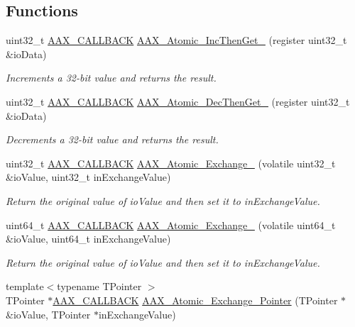 \subsection*{Functions}
\begin{DoxyCompactItemize}
\item 
uint32\+\_\+t \hyperlink{a00149_aaa22112139aa627574b1ef562f579d43}{A\+A\+X\+\_\+\+C\+A\+L\+L\+B\+A\+C\+K} \hyperlink{a00159_ad971a8dca9cea34ca7b3a0082c1c4795}{A\+A\+X\+\_\+\+Atomic\+\_\+\+Inc\+Then\+Get\+\_} (register uint32\+\_\+t \&io\+Data)
\begin{DoxyCompactList}\small\item\em Increments a 32-\/bit value and returns the result. \end{DoxyCompactList}\item 
uint32\+\_\+t \hyperlink{a00149_aaa22112139aa627574b1ef562f579d43}{A\+A\+X\+\_\+\+C\+A\+L\+L\+B\+A\+C\+K} \hyperlink{a00159_a1802487e752c85c59d097b0863bdf471}{A\+A\+X\+\_\+\+Atomic\+\_\+\+Dec\+Then\+Get\+\_} (register uint32\+\_\+t \&io\+Data)
\begin{DoxyCompactList}\small\item\em Decrements a 32-\/bit value and returns the result. \end{DoxyCompactList}\item 
uint32\+\_\+t \hyperlink{a00149_aaa22112139aa627574b1ef562f579d43}{A\+A\+X\+\_\+\+C\+A\+L\+L\+B\+A\+C\+K} \hyperlink{a00159_a44eb82707be40dd559db9051317c10d0}{A\+A\+X\+\_\+\+Atomic\+\_\+\+Exchange\+\_} (volatile uint32\+\_\+t \&io\+Value, uint32\+\_\+t in\+Exchange\+Value)
\begin{DoxyCompactList}\small\item\em Return the original value of io\+Value and then set it to in\+Exchange\+Value. \end{DoxyCompactList}\item 
uint64\+\_\+t \hyperlink{a00149_aaa22112139aa627574b1ef562f579d43}{A\+A\+X\+\_\+\+C\+A\+L\+L\+B\+A\+C\+K} \hyperlink{a00159_a0a683337ef8627f1e2b01e69d5f11cb0}{A\+A\+X\+\_\+\+Atomic\+\_\+\+Exchange\+\_} (volatile uint64\+\_\+t \&io\+Value, uint64\+\_\+t in\+Exchange\+Value)
\begin{DoxyCompactList}\small\item\em Return the original value of io\+Value and then set it to in\+Exchange\+Value. \end{DoxyCompactList}\item 
{\footnotesize template$<$typename T\+Pointer $>$ }\\T\+Pointer $\ast$\hyperlink{a00149_aaa22112139aa627574b1ef562f579d43}{A\+A\+X\+\_\+\+C\+A\+L\+L\+B\+A\+C\+K} \hyperlink{a00159_a02803b3ea269d4ed4758a91eec9fa46c}{A\+A\+X\+\_\+\+Atomic\+\_\+\+Exchange\+\_\+\+Pointer} (T\+Pointer $\ast$\&io\+Value, T\+Pointer $\ast$in\+Exchange\+Value)

\end{DoxyCompactItemize}

